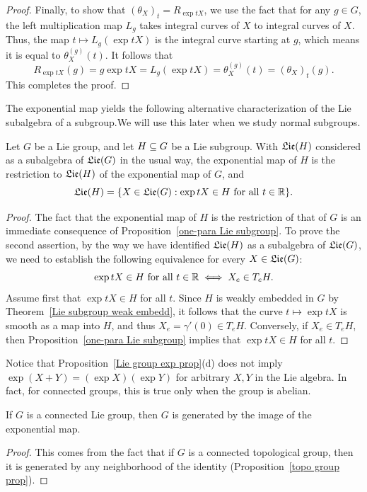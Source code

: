 \begin{proof}
Finally, to show that $(\theta_X)_t=R_{\exp tX}$, we use the fact that for any $g\in G$, the left multiplication map $L_g$ takes integral curves of $X$ to integral curves of $X$. Thus, the map $t\mapsto L_g(\exp tX)$ is the integral curve starting at $g$, which means it is equal to $\theta_X^{(g)}(t)$. It follows that
\[R_{\exp tX}(g)=g\exp tX=L_g(\exp tX)=\theta_X^{(g)}(t)=(\theta_X)_t(g).\]
This completes the proof.
\end{proof}
The exponential map yields the following alternative characterization of the Lie subalgebra of a subgroup.We will use this later when we study normal subgroups.
\begin{proposition}\label{Lie subalgebra exp}
Let $G$ be a Lie group, and let $H\subseteq G$ be a Lie subgroup. With $\mathfrak{Lie}(H)$ considered as a subalgebra of $\mathfrak{Lie}(G)$ in the usual way, the exponential map of $H$ is the restriction to $\mathfrak{Lie}(H)$ of the exponential map of $G$, and
\[\mathfrak{Lie}(H)=\{X\in\mathfrak{Lie}(G):\exp tX\in H\text{ for all $t\in\mathbb{R}$}\}.\]
\end{proposition}
\begin{proof}
The fact that the exponential map of $H$ is the restriction of that of $G$ is an immediate consequence of Proposition~\ref{one-para Lie subgroup}. To prove the second assertion, by the way we have identified $\mathfrak{Lie}(H)$ as a subalgebra of $\mathfrak{Lie}(G)$, we need to establish the following equivalence for every $X\in\mathfrak{Lie}(G)$:
\[\exp tX\in H\text{ for all $t\in\mathbb{R}$}\iff X_e\in T_eH.\]
Assume first that $\exp tX\in H$ for all $t$. Since $H$ is weakly embedded in $G$ by
Theorem~\ref{Lie subgroup weak embedd}, it follows that the curve $t\mapsto\exp tX$ is smooth as a map into $H$, and thus $X_e=\gamma'(0)\in T_eH$. Conversely, if $X_e\in T_eH$, then Proposition~\ref{one-para Lie subgroup} implies that $\exp tX\in H$ for all $t$.
\end{proof}
Notice that Proposition~\ref{Lie group exp prop}(d) does not imply $\exp(X+Y)=(\exp X)(\exp Y)$ for arbitrary $X,Y$ in the Lie algebra. In fact, for connected groups, this is true only when the group is abelian.
\begin{proposition}\label{Lie group exp generate}
If $G$ is a connected Lie group, then $G$ is generated by the image of the exponential map.
\end{proposition}
\begin{proof}
This comes from the fact that if $G$ is a connected topological group, then it is generated by any neighborhood of the identity (Proposition~\ref{topo group prop}).
\end{proof}
